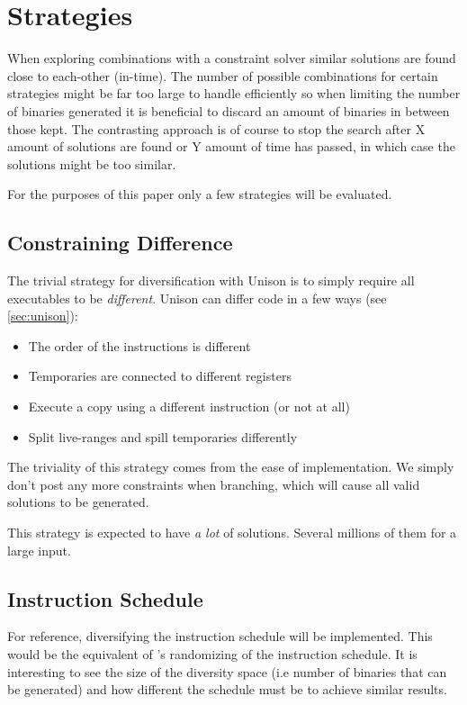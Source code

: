 \section{Strategies}

When exploring combinations with a constraint solver similar solutions are found close to
each-other (in-time).  The number of possible combinations for certain strategies might be
far too large to handle efficiently so when limiting the number of binaries generated it is
beneficial to discard an amount of binaries in between those kept. The contrasting approach
is of course to stop the search after X amount of solutions are found or Y amount of time
has passed, in which case the solutions might be too similar.

For the purposes of this paper only a few strategies will be evaluated.

\subsection{Constraining Difference}

The trivial strategy for diversification with Unison is to simply require all executables
to be \textit{different}. Unison can differ code in a few ways (see \ref{sec:unison}):

\begin{itemize}
	\item The order of the instructions is different
	\item Temporaries are connected to different registers
	\item Execute a copy using a different instruction (or not at all)
	\item Split live-ranges and spill temporaries differently
\end{itemize}

The triviality of this strategy comes from the ease of implementation. We simply don't post
any more constraints when branching, which will cause all valid solutions to be generated.

This strategy is expected to have \textit{a lot} of solutions. Several millions of them
for a large input.

\subsection{Instruction Schedule}

For reference, diversifying the instruction schedule will be implemented. This would be
the equivalent of \textcite{large-scale-automated}'s randomizing of the instruction
schedule. It is interesting to see the size of the diversity space (i.e number of binaries
that can be generated) and how different the schedule must be to achieve similar results.

